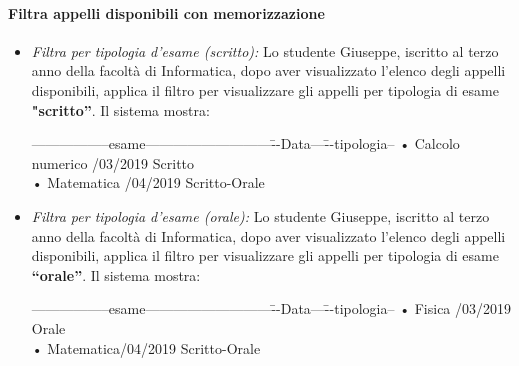 \paragraph{Filtra appelli disponibili con memorizzazione}
\begin{itemize}
	\item \textit{Filtra per tipologia d’esame (scritto):}
	Lo studente Giuseppe, iscritto al terzo anno della facoltà di Informatica, dopo aver visualizzato l’elenco degli appelli disponibili, applica il filtro per visualizzare gli appelli per tipologia di esame \textbf{"scritto”}. Il sistema mostra:  
	\begin{tabbing}
		\hspace{1cm}-----------------esame---------------------------\=--Data---\= --tipologia--\kill
		\hspace{1cm} • Calcolo numerico  /03/2019 \> \hspace{1cm}Scritto \\
		\hspace{1cm} • Matematica /04/2019 \> \hspace{1cm}Scritto-Orale  \\
	\end{tabbing}
	
	\item \textit{Filtra per tipologia d’esame (orale):}
	Lo studente Giuseppe, iscritto al terzo anno della facoltà di Informatica, dopo aver visualizzato l’elenco degli appelli disponibili, applica il filtro per visualizzare gli appelli per tipologia di esame \textbf{“orale”}. Il sistema mostra:
	\begin{tabbing}
		\hspace{1cm}-----------------esame---------------------------\=--Data---\= --tipologia--\kill
		\hspace{1cm} • Fisica  /03/2019\> \hspace{1cm}Orale \\
		\hspace{1cm} • Matematica/04/2019 \> \hspace{1cm}Scritto-Orale \\
	\end{tabbing}


\end{itemize}
